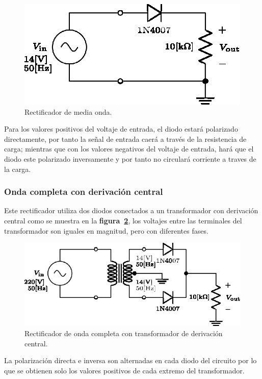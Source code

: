 \documentclass[letter,twoside,11pt]{article}
\begin{document}
\begin{figure}[!h]
\centering
\includegraphics[scale=1.25]{02.media_onda1.eps}
\caption{Rectificador de media onda.}
\label{circuito2}
\end{figure}

Para los valores positivos del voltaje de entrada, el diodo estará polarizado
directamente, por tanto la señal de entrada caerá a través de la resistencia de
carga; mientras que con los valores negativos del voltaje de entrada, hará que
el diodo este polarizado inversamente y por tanto no circulará corriente a
traves de la carga.

\subsubsection{Onda completa con derivación central}
Este rectificador utiliza dos diodos conectados a un transformador con
derivación central como se muestra en la \textbf{figura~\ref{circuito3}}, los
voltajes entre las terminales del transformador son iguales en magnitud, pero
con diferentes fases.

\begin{figure}[!h]
\centering
\includegraphics[scale=1.25]{03.derivacion_central1.eps}
\caption{Rectificador de onda completa con transformador de derivación central.}
\label{circuito3}
\end{figure}

La polarización directa e inversa son alternadas en cada diodo del circuito por
lo que se obtienen solo los valores positivos de cada extremo del transformador.
\end{document}
